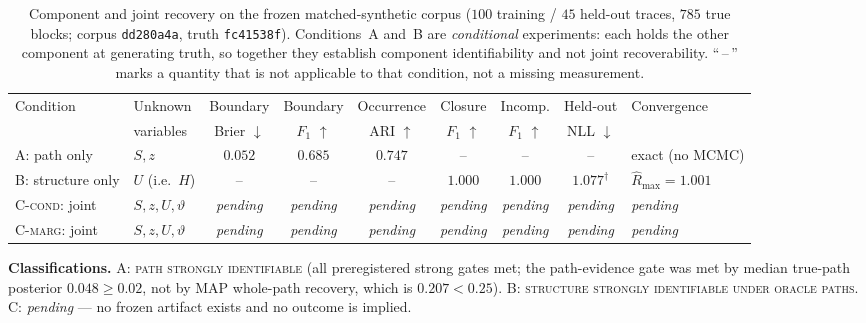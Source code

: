%

\begin{table}[t]
\centering
\small
\setlength{\tabcolsep}{4.5pt}
\caption{%
Component and joint recovery on the frozen matched-synthetic corpus
($100$ training / $45$ held-out traces, $785$ true blocks; corpus
\texttt{dd280a4a}, truth \texttt{fc41538f}).
Conditions~A and~B are \emph{conditional} experiments: each holds the other
component at generating truth, so together they establish component
identifiability and not joint recoverability.
``\,--\,'' marks a quantity that is not applicable to that condition, not a
missing measurement.%
}
\label{tab:matched-synthetic}
\begin{tabular}{@{}llccccccl@{}}
\toprule
Condition & Unknown & Boundary & Boundary & Occurrence & Closure & Incomp. & Held-out & Convergence \\
          & variables & Brier $\downarrow$ & $F_1$ $\uparrow$ & ARI $\uparrow$ & $F_1$ $\uparrow$ & $F_1$ $\uparrow$ & NLL $\downarrow$ & \\
\midrule
A: path only
  & $S, z$
  & $0.052$ & $0.685$ & $0.747$
  & -- & --
  & --
  & exact (no MCMC) \\
B: structure only
  & $U$ (i.e.\ $H$)
  & -- & -- & --
  & $1.000$ & $1.000$
  & $1.077^{\dagger}$
  & $\widehat{R}_{\max}\!=\!1.001$ \\
C-\textsc{cond}: joint
  & $S, z, U, \vartheta$
  & \textit{pending} & \textit{pending} & \textit{pending}
  & \textit{pending} & \textit{pending}
  & \textit{pending}
  & \textit{pending} \\
C-\textsc{marg}: joint
  & $S, z, U, \vartheta$
  & \textit{pending} & \textit{pending} & \textit{pending}
  & \textit{pending} & \textit{pending}
  & \textit{pending}
  & \textit{pending} \\
\bottomrule
\end{tabular}

\vspace{2pt}
\begin{minipage}{\linewidth}
\footnotesize
\textbf{Classifications.}
A: \textsc{path strongly identifiable} (all preregistered strong gates met;
the path-evidence gate was met by median true-path posterior $0.048 \geq 0.02$,
not by MAP whole-path recovery, which is $0.207 < 0.25$).
B: \textsc{structure strongly identifiable under oracle paths}.
C: \textit{pending} --- no frozen artifact exists and no outcome is implied.


\end{minipage}
\end{table}
